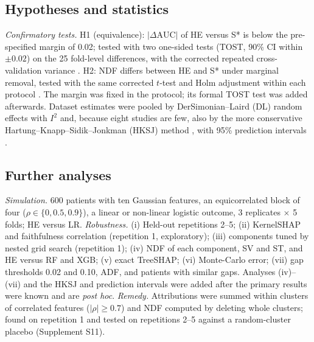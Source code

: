 \subsection{Hypotheses and statistics}
\emph{Confirmatory tests.} H1 (equivalence): $|\Delta\mathrm{AUC}|$ of HE versus S* is below the pre-specified margin of 0.02; tested with two one-sided tests (TOST, 90\% CI within $\pm0.02$) on the 25 fold-level differences, with the corrected repeated cross-validation variance \cite{nadeau}. H2: NDF differs between HE and S* under marginal removal, tested with the same corrected $t$-test and Holm adjustment within each protocol \cite{holm}. The margin was fixed in the protocol; its formal TOST test was added afterwards. Dataset estimates were pooled by DerSimonian--Laird (DL) random effects \cite{dersimonian} with $I^2$ \cite{higgins} and, because eight studies are few, also by the more conservative Hartung--Knapp--Sidik--Jonkman (HKSJ) method \cite{inthout}, with 95\% prediction intervals \cite{riley}.

\subsection{Further analyses}
\emph{Simulation.} 600 patients with ten Gaussian features, an equicorrelated block of four ($\rho\in\{0,0.5,0.9\}$), a linear or non-linear logistic outcome, 3 replicates $\times$ 5 folds; HE versus LR.
\emph{Robustness.} (i) Held-out repetitions 2--5; (ii) KernelSHAP and faithfulness correlation \cite{bhatt} (repetition 1, exploratory); (iii) components tuned by nested grid search (repetition 1); (iv) NDF of each component, SV and ST, and HE versus RF and XGB; (v) exact TreeSHAP; (vi) Monte-Carlo error; (vii) gap thresholds 0.02 and 0.10, ADF, and patients with similar gaps. Analyses (iv)--(vii) and the HKSJ and prediction intervals were added after the primary results were known and are \emph{post hoc}.
\emph{Remedy.} Attributions were summed within clusters of correlated features ($|\rho|\ge0.7$) and NDF computed by deleting whole clusters; found on repetition 1 and tested on repetitions 2--5 against a random-cluster placebo (Supplement S11).
